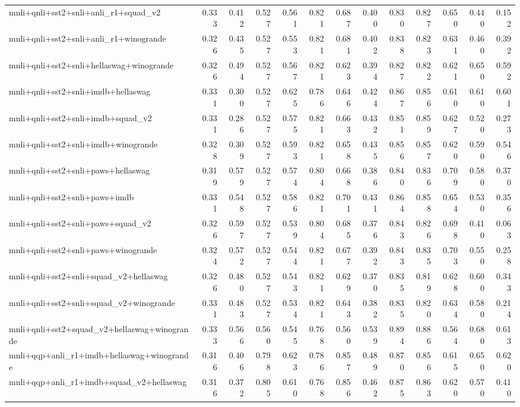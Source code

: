 \begin{table}[t]
\begin{tabular}{lrrrrrrrrrrrr}
    mnli+qnli+sst2+snli+anli\_r1+squad\_v2 & 0.333 & 0.412 & 0.527 & 0.561 & 0.821 & 0.687 & 0.400 & 0.830 & 0.827 & 0.650 & 0.440 & 0.152 \\
    mnli+qnli+sst2+snli+anli\_r1+winogrande & 0.326 & 0.435 & 0.527 & 0.553 & 0.821 & 0.681 & 0.402 & 0.838 & 0.823 & 0.631 & 0.460 & 0.392 \\
    mnli+qnli+sst2+snli+hellaswag+winogrande & 0.326 & 0.494 & 0.527 & 0.567 & 0.821 & 0.623 & 0.394 & 0.827 & 0.822 & 0.621 & 0.650 & 0.592 \\
    mnli+qnli+sst2+snli+imdb+hellaswag & 0.331 & 0.300 & 0.527 & 0.625 & 0.786 & 0.646 & 0.424 & 0.867 & 0.856 & 0.610 & 0.610 & 0.601 \\
    mnli+qnli+sst2+snli+imdb+squad\_v2 & 0.331 & 0.286 & 0.527 & 0.575 & 0.821 & 0.663 & 0.432 & 0.851 & 0.859 & 0.627 & 0.520 & 0.273 \\
    mnli+qnli+sst2+snli+imdb+winogrande & 0.328 & 0.309 & 0.527 & 0.593 & 0.821 & 0.658 & 0.435 & 0.856 & 0.857 & 0.620 & 0.590 & 0.546 \\
    mnli+qnli+sst2+snli+paws+hellaswag & 0.319 & 0.579 & 0.527 & 0.574 & 0.804 & 0.668 & 0.386 & 0.840 & 0.836 & 0.709 & 0.580 & 0.370 \\
    mnli+qnli+sst2+snli+paws+imdb & 0.331 & 0.548 & 0.527 & 0.586 & 0.821 & 0.701 & 0.431 & 0.864 & 0.858 & 0.654 & 0.530 & 0.356 \\
    mnli+qnli+sst2+snli+paws+squad\_v2 & 0.326 & 0.597 & 0.527 & 0.539 & 0.804 & 0.685 & 0.376 & 0.843 & 0.826 & 0.698 & 0.410 & 0.063 \\
    mnli+qnli+sst2+snli+paws+winogrande & 0.324 & 0.572 & 0.527 & 0.544 & 0.821 & 0.677 & 0.392 & 0.843 & 0.835 & 0.703 & 0.550 & 0.258 \\
    mnli+qnli+sst2+snli+squad\_v2+hellaswag & 0.326 & 0.480 & 0.527 & 0.543 & 0.821 & 0.629 & 0.370 & 0.835 & 0.819 & 0.628 & 0.600 & 0.343 \\
    mnli+qnli+sst2+snli+squad\_v2+winogrande & 0.331 & 0.483 & 0.527 & 0.534 & 0.821 & 0.643 & 0.382 & 0.835 & 0.820 & 0.634 & 0.580 & 0.214 \\
    mnli+qnli+sst2+squad\_v2+hellaswag+winogrande & 0.333 & 0.566 & 0.560 & 0.545 & 0.768 & 0.560 & 0.539 & 0.894 & 0.886 & 0.564 & 0.680 & 0.613 \\
    mnli+qqp+anli\_r1+imdb+hellaswag+winogrande & 0.316 & 0.406 & 0.798 & 0.623 & 0.786 & 0.857 & 0.489 & 0.870 & 0.856 & 0.615 & 0.650 & 0.620 \\
    mnli+qqp+anli\_r1+imdb+squad\_v2+hellaswag & 0.316 & 0.372 & 0.805 & 0.610 & 0.768 & 0.856 & 0.462 & 0.875 & 0.863 & 0.620 & 0.570 & 0.410 \\

\end{tabular}
\end{table}

